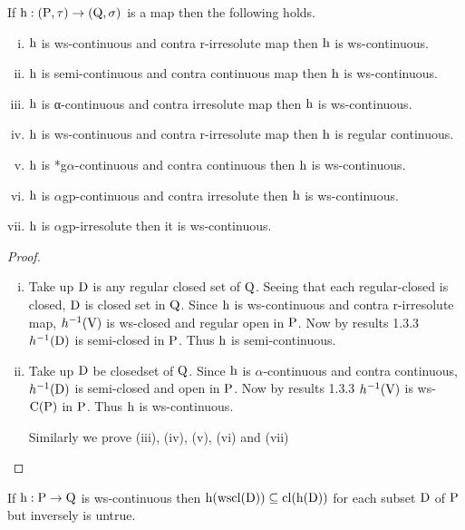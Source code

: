 \begin{thm}\label{thm3.2.16}
If $\mathrm{h}: (\mathrm{P},\tau )\to (\mathrm{Q}, \sigma)$ is a map then the following holds.
\begin{enumerate}[(i)]
\item $\mathrm{h}$ is ws-continuous and contra r-irresolute map then $\mathrm{h}$ is ws-continuous.
\item $\mathrm{h}$ is semi-continuous and contra continuous map then $\mathrm{h}$ is ws-continuous.
\item $\mathrm{h}$ is α-continuous and contra irresolute map then $\mathrm{h}$ is ws-continuous.
\item $\mathrm{h}$ is ws-continuous and contra r-irresolute map then $\mathrm{h}$ is regular continuous.
\item $\mathrm{h}$ is *g$\alpha$-continuous and contra continuous then $\mathrm{h}$ is ws-continuous.
\item $\mathrm{h}$ is $\alpha$gp-continuous and contra irresolute then $\mathrm{h}$ is ws-continuous.
\item $\mathrm{h}$ is $\alpha$gp-irresolute then it is ws-continuous.
\end{enumerate}
\end{thm}

\begin{proof}
\begin{enumerate}[(i)]
\item Take up $\mathrm{D}$ is any regular closed set of $\mathrm{Q}$. Seeing that each regular-closed is closed, $\mathrm{D}$ is closed set in $\mathrm{Q}$. Since $\mathrm{h}$ is ws-continuous and contra r-irresolute map, $h^{-1} (\mathrm{V})$ is ws-closed and regular open in $\mathrm{P}$. Now by results 1.3.3 \cite{key5} $h^{-1} (\mathrm{D})$ is semi-closed in $\mathrm{P}$. Thus $\mathrm{h}$ is semi-continuous.

\item Take up $\mathrm{D}$ be closedset of $\mathrm{Q}$. Since $\mathrm{h}$ is $\alpha$-continuous and contra continuous, $h^{-1} (\mathrm{D})$ is semi-closed and open in $\mathrm{P}$. Now by results 1.3.3 \cite{key5} $h^{-1} (\mathrm{V})$ is ws-$\mathrm{C}(\mathrm{P})$ in $\mathrm{P}$. Thus $\mathrm{h}$ is ws-continuous.

Similarly we prove (iii), (iv), (v), (vi) and (vii)
\end{enumerate}
\end{proof}

\begin{thm}\label{thm3.2.17}
If $\mathrm{h}: \mathrm{P}\to \mathrm{Q}$ is ws-continuous then $\mathrm{h}(\mathrm{wscl}(\mathrm{D}))\subseteq \mathrm{cl}(\mathrm{h}(\mathrm{D}))$ for each subset $\mathrm{D}$ of $\mathrm{P}$ but inversely is untrue.
\end{thm}

